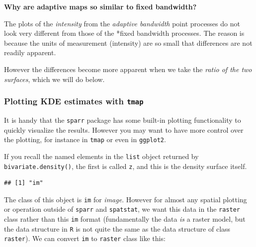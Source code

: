 \documentclass[
]{book}
\newenvironment{Shaded}{\begin{snugshade}}{\end{snugshade}}
\newcommand{\FunctionTok}[1]{\textcolor[rgb]{0.13,0.29,0.53}{\textbf{#1}}}
\newcommand{\NormalTok}[1]{#1}
\newcommand{\SpecialCharTok}[1]{\textcolor[rgb]{0.81,0.36,0.00}{\textbf{#1}}}
\newenvironment{rmdnote}[1]
  {
  \begin{itemize}
  \renewcommand{\labelitemi}{
    \raisebox{-.7\height}[0pt][0pt]{
      {\setkeys{Gin}{width=3em,keepaspectratio}\texttt{[image: images/\#1]}}
    }
  }
  \setlength{\fboxsep}{1em}
  \begin{note}
  \item
  }
  {
  \end{note}
  \end{itemize}
  }
\begin{document}
\begin{rmdnote}{note}
\textbf{Why are adaptive maps so similar to fixed bandwidth?}

The plots of the \emph{intensity} from the \emph{adaptive bandwidth} point processes do not look very different from those of the *fixed bandwidth processes. The reason is because the units of measurement (intensity) are so small that differences are not readily apparent.

However the differences become more apparent when we take the \emph{ratio of the two surfaces}, which we will do below.

\end{rmdnote}

\hypertarget{plotting-kde-estimates-with-tmap}{%
\subsubsection{\texorpdfstring{Plotting KDE estimates with \texttt{tmap}}{Plotting KDE estimates with tmap}}\label{plotting-kde-estimates-with-tmap}}

It is handy that the \texttt{sparr} package has some built-in plotting functionality to quickly visualize the results. However you may want to have more control over the plotting, for instance in \texttt{tmap} or even in \texttt{ggplot2}.

If you recall the named elements in the \texttt{list} object returned by \texttt{bivariate.density()}, the first is called \texttt{z}, and this is the density surface itself.

\begin{Shaded}
\end{Shaded}

\begin{verbatim}
## [1] "im"
\end{verbatim}

The class of this object is \texttt{im} for \emph{image}. However for almost any spatial plotting or operation outside of \texttt{sparr} and \texttt{spatstat}, we want this data in the \texttt{raster} class rather than this \texttt{im} format (fundamentally the data \emph{is} a raster model, but the data structure in \texttt{R} is not quite the same as the data structure of class \texttt{raster}). We can convert \texttt{im} to \texttt{raster} class like this:
\end{document}
